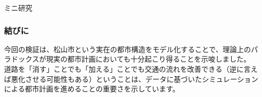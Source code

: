 \begin{column}{ミニ研究}
\subsubsection*{結びに}
今回の検証は、松山市という実在の都市構造をモデル化することで、理論上のパラドックスが現実の都市計画においても十分起こり得ることを示唆しました。
道路を「消す」ことでも「加える」ことでも交通の流れを改善できる（逆に言えば悪化させる可能性もある）ということは、データに基づいたシミュレーションによる都市計画を進めることの重要さを示しています。

\end{column}
\clearpage

